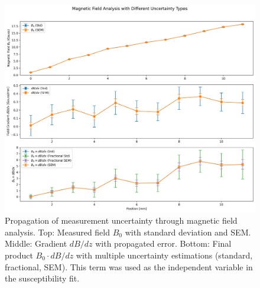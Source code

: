 \begin{figure}[H]
	\centering
	\includegraphics[width=\textwidth]{Assests/Uncertainty_Propagation_Plot.png}
	\caption{Propagation of measurement uncertainty through magnetic field analysis. Top: Measured field $B_0$ with standard deviation and SEM. Middle: Gradient $dB/dz$ with propagated error. Bottom: Final product $B_0 \cdot dB/dz$ with multiple uncertainty estimations (standard, fractional, SEM). This term was used as the independent variable in the susceptibility fit.}
	\label{fig:uncertainty}
\end{figure}
